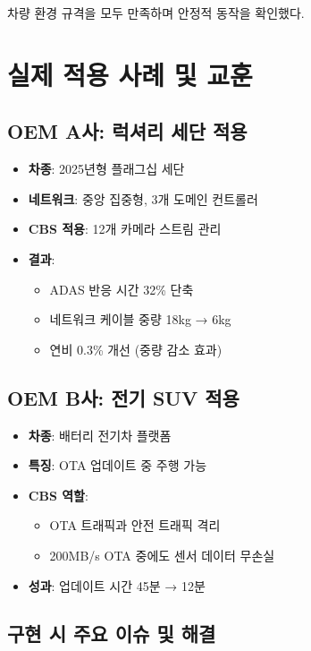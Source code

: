 \documentclass[twocolumn,10pt]{article}
\begin{document}
차량 환경 규격을 모두 만족하며 안정적 동작을 확인했다.

\section{실제 적용 사례 및 교훈}
\label{sec:deployment}

\subsection{OEM A사: 럭셔리 세단 적용}

\begin{itemize}
    \item \textbf{차종}: 2025년형 플래그십 세단
    \item \textbf{네트워크}: 중앙 집중형, 3개 도메인 컨트롤러
    \item \textbf{CBS 적용}: 12개 카메라 스트림 관리
    \item \textbf{결과}: 
        \begin{itemize}
            \item ADAS 반응 시간 32\% 단축
            \item 네트워크 케이블 중량 18kg → 6kg
            \item 연비 0.3\% 개선 (중량 감소 효과)
        \end{itemize}
\end{itemize}

\subsection{OEM B사: 전기 SUV 적용}

\begin{itemize}
    \item \textbf{차종}: 배터리 전기차 플랫폼
    \item \textbf{특징}: OTA 업데이트 중 주행 가능
    \item \textbf{CBS 역할}: 
        \begin{itemize}
            \item OTA 트래픽과 안전 트래픽 격리
            \item 200MB/s OTA 중에도 센서 데이터 무손실
        \end{itemize}
    \item \textbf{성과}: 업데이트 시간 45분 → 12분
\end{itemize}

\subsection{구현 시 주요 이슈 및 해결}
\end{document}
